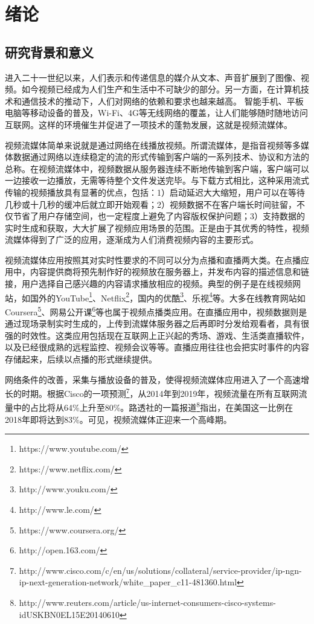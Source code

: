 \chapter{绪论}

\section{研究背景和意义}

进入二十一世纪以来，人们表示和传递信息的媒介从文本、声音扩展到了图像、视频。如今视频已经成为人们生产和生活中不可缺少的部分。另一方面，在计算机技术和通信技术的推动下，人们对网络的依赖和要求也越来越高。
智能手机、平板电脑等移动设备的普及，Wi-Fi、4G等无线网络的覆盖，让人们能够随时随地访问互联网。这样的环境催生并促进了一项技术的蓬勃发展，这就是视频流媒体。

视频流媒体简单来说就是通过网络在线播放视频。所谓流媒体，是指音视频等多媒体数据通过网络以连续稳定的流的形式传输到客户端的一系列技术、协议和方法的总称。在视频流媒体中，视频数据从服务器连续不断地传输到客户端，客户端可以一边接收一边播放，无需等待整个文件发送完毕。与下载方式相比，这种采用流式传输的视频播放具有显著的优点\supercite{Li2002}，包括：1）启动延迟大大缩短，用户可以在等待几秒或十几秒的缓冲后就立即开始观看；2）视频数据不在客户端长时间驻留，不仅节省了用户存储空间，也一定程度上避免了内容版权保护问题；3）支持数据的实时生成和获取，大大扩展了视频应用场景的范围。正是由于其优秀的特性，视频流媒体得到了广泛的应用，逐渐成为人们消费视频内容的主要形式\supercite{Chen2013}。

视频流媒体应用按照其对实时性要求的不同可以分为点播和直播两大类。在点播应用中，内容提供商将预先制作好的视频放在服务器上，并发布内容的描述信息和链接，用户选择自己感兴趣的内容请求播放相应的视频。典型的例子是在线视频网站，如国外的YouTube\footnote{https://www.youtube.com/}、Netflix\footnote{https://www.netflix.com/}，国内的优酷\footnote{http://www.youku.com/}、乐视\footnote{http://www.le.com/}等。大多在线教育网站如Coursera\footnote{https://www.coursera.org/}、网易公开课\footnote{http://open.163.com/}等也属于视频点播类应用。在直播应用中，视频数据则是通过现场录制实时生成的，上传到流媒体服务器之后再即时分发给观看者，具有很强的时效性。这类应用包括现在互联网上正兴起的秀场、游戏、生活类直播软件，以及已经很成熟的远程监控、视频会议等等。直播应用往往也会把实时事件的内容存储起来，后续以点播的形式继续提供。

网络条件的改善，采集与播放设备的普及，使得视频流媒体应用进入了一个高速增长的时期。根据Cisco的一项预测\footnote{http://www.cisco.com/c/en/us/solutions/collateral/service-provider/ip-ngn-ip-next-generation-network/white\_paper\_c11-481360.html}，从2014年到2019年，视频流量在所有互联网流量中的占比将从64\%上升至80\%。路透社的一篇报道\footnote{http://www.reuters.com/article/us-internet-consumers-cisco-systems-idUSKBN0EL15E20140610}指出，在美国这一比例在2018年即将达到83\%。可见，视频流媒体正迎来一个高峰期。

